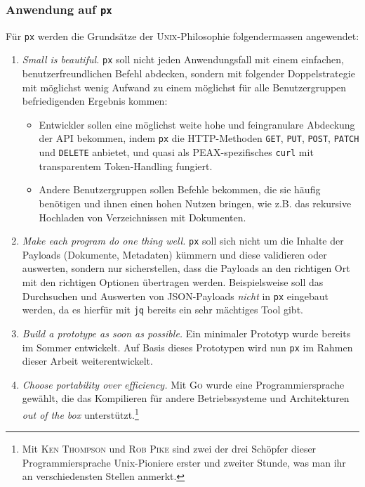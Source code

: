 \subsubsection{Anwendung auf \texttt{px}}

Für \texttt{px} werden die Grundsätze der \textsc{Unix}-Philosophie folgendermassen angewendet:

\begin{enumerate}
    \item \textit{Small is beautiful.} \texttt{px} soll nicht jeden Anwendungsfall mit einem einfachen, benutzerfreundlichen Befehl abdecken, sondern mit folgender Doppelstrategie mit möglichst wenig Aufwand zu einem möglichst für alle Benutzergruppen befriedigenden Ergebnis kommen:
    \begin{itemize}
        \item Entwickler sollen eine möglichst weite hohe und feingranulare Abdeckung der API bekommen, indem \texttt{px} die HTTP-Methoden \texttt{GET}, \texttt{PUT}, \texttt{POST}, \texttt{PATCH} und \texttt{DELETE} anbietet, und quasi als PEAX-spezifisches \texttt{curl} mit transparentem Token-Handling fungiert.
        \item Andere Benutzergruppen sollen Befehle bekommen, die sie häufig benötigen und ihnen einen hohen Nutzen bringen, wie z.B. das rekursive Hochladen von Verzeichnissen mit Dokumenten.
    \end{itemize}
    \item \textit{Make each program do one thing well.} \texttt{px} soll sich nicht um die Inhalte der Payloads (Dokumente, Metadaten) kümmern und diese validieren oder auswerten, sondern nur sicherstellen, dass die Payloads an den richtigen Ort mit den richtigen Optionen übertragen werden. Beispielsweise soll das Durchsuchen und Auswerten von JSON-Payloads \textit{nicht} in \texttt{px} eingebaut werden, da es hierfür mit \texttt{jq} bereits ein sehr mächtiges Tool gibt.
    \item \textit{Build a prototype as soon as possible.} Ein minimaler Prototyp wurde bereits im Sommer entwickelt. Auf Basis dieses Prototypen wird nun \texttt{px} im Rahmen dieser Arbeit weiterentwickelt.
    \item \textit{Choose portability over efficiency.} Mit \textsc{Go} wurde eine Programmiersprache gewählt, die das Kompilieren für andere Betriebssysteme und Architekturen \textit{out of the box} unterstützt.\footnote{Mit \textsc{Ken Thompson} und \textsc{Rob Pike} sind zwei der drei Schöpfer dieser Programmiersprache Unix-Pioniere erster und zweiter Stunde, was man ihr an verschiedensten Stellen anmerkt.}

\end{enumerate}

